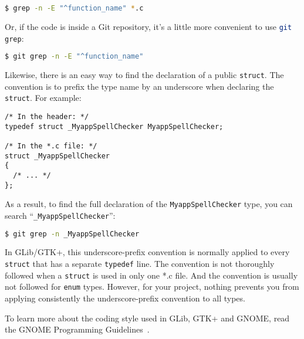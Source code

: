 \begin{lstlisting}[language=bash]
$ grep -n -E "^function_name" *.c
\end{lstlisting}

Or, if the code is inside a Git repository, it's a little more convenient to use \lstinline[language=bash]{git grep}:

\begin{lstlisting}[language=bash]
$ git grep -n -E "^function_name"
\end{lstlisting}

Likewise, there is an easy way to find the declaration of a public \lstinline{struct}. The convention is to prefix the type name by an underscore when declaring the \lstinline{struct}. For example:
\begin{lstlisting}
/* In the header: */
typedef struct _MyappSpellChecker MyappSpellChecker;

/* In the *.c file: */
struct _MyappSpellChecker
{
  /* ... */
};
\end{lstlisting}

As a result, to find the full declaration of the \lstinline{MyappSpellChecker} type, you can search ``\lstinline{_MyappSpellChecker}'':

\begin{lstlisting}[language=bash]
$ git grep -n _MyappSpellChecker
\end{lstlisting}

In GLib/GTK+, this underscore-prefix convention is normally applied to every \lstinline{struct} that has a separate \lstinline{typedef} line. The convention is not thoroughly followed when a \lstinline{struct} is used in only one *.c file. And the convention is usually not followed for \lstinline{enum} types. However, for your project, nothing prevents you from applying consistently the underscore-prefix convention to all types.

To learn more about the coding style used in GLib, GTK+ and GNOME, read the GNOME Programming Guidelines~\cite{gnome-programming-guidelines}.
